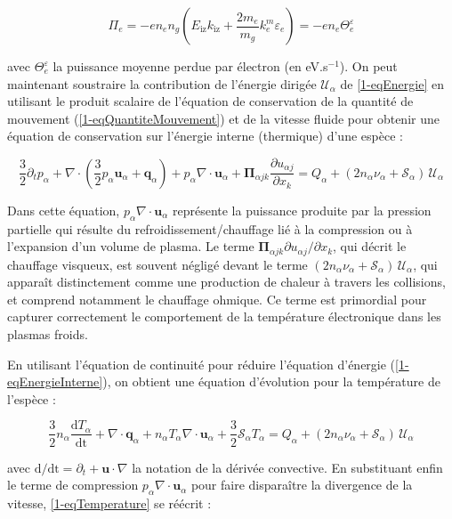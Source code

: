 \begin{refsection}
\begin{equation}
	\Pi_e=-en_en_g\left(E_\text{iz}k_\text{iz}+\frac{2m_e}{m_g}k^m_e\varepsilon_e\right)=-en_e\Theta_e^\varepsilon
\end{equation}

avec $\Theta_e^\varepsilon$ la puissance moyenne perdue par électron (en
eV.s$^{-1}$). On peut maintenant soustraire la contribution de l'énergie
dirigée $\mathcal{U}_{\alpha}$ de \eqref{1-eqEnergie} en utilisant le produit
scalaire de l'équation de conservation de la quantité de mouvement
(\eqref{1-eqQuantiteMouvement}) et de la vitesse fluide pour obtenir une
équation de conservation sur l'énergie interne (thermique) d'une espèce :

\begin{equation}
\label{1-eqEnergieInterne}
\frac{3}{2}\partial_t p_\alpha + 
\nabla\cdot\left(\frac{3}{2}p_\alpha
\mathbf{u}_\alpha+\mathbf q_\alpha\right)+p_\alpha\nabla\cdot\mathbf u_\alpha
+\boldsymbol{\Pi}_{\alpha j k}\frac{\partial u_{\alpha j}}{\partial{x_k}} =
{Q_\alpha}+(2n_\alpha\nu_\alpha+\mathcal{S}_\alpha)\,\mathcal{U}_\alpha
\end{equation}

Dans cette équation, $p_\alpha\nabla\cdot\mathbf u_\alpha$ représente la
puissance produite par la pression partielle qui résulte du
refroidissement/chauffage lié à la compression ou à l'expansion d'un volume de
plasma. Le terme $\boldsymbol{\Pi}_{\alpha j k}\partial u_{\alpha
j}/\partial{x_k}$, qui décrit le chauffage visqueux, est souvent négligé
devant le terme $(2n_\alpha\nu_\alpha+\mathcal{S}_\alpha)\,\mathcal{U}_\alpha$, 
qui apparaît distinctement comme une production de chaleur
à travers les collisions, et comprend notamment le chauffage ohmique. Ce
 terme est primordial pour capturer correctement le comportement de la
température électronique dans les plasmas froids.

En utilisant l'équation de
continuité pour réduire l'équation d'énergie (\eqref{1-eqEnergieInterne}), on
obtient une équation d'évolution pour la température de l'espèce :

\begin{equation}
\label{1-eqTemperature}
\frac{3}{2}n_\alpha\frac{\text{d}T_\alpha}{\text{dt}}+\nabla\cdot\mathbf
q_\alpha + n_\alpha T_\alpha\nabla\cdot\mathbf u_\alpha +
\frac{3}{2}\mathcal{S}_\alpha T_\alpha =
{Q_\alpha}+(2n_\alpha\nu_\alpha+\mathcal{S}_\alpha)\,\mathcal{U}_\alpha
\end{equation}

avec $\text{d}/\text{dt}=\partial_t+\mathbf u\cdot\nabla$ la notation de la
dérivée convective. En substituant enfin le terme de compression
$p_\alpha\nabla\cdot\mathbf u_\alpha$ pour faire disparaître la divergence de la
vitesse, \eqref{1-eqTemperature} se réécrit :


\end{refsection}
